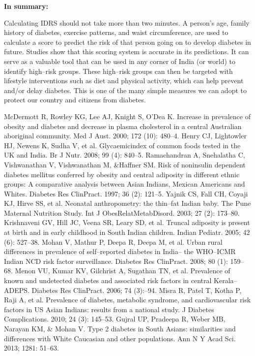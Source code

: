 \noindent\textbf{In summary:}

Calculating IDRS should not take more than two minutes. A person’s age, family history of diabetes, exercise patterns, and waist circumference, are used to calculate a score to predict the risk of that person going on to develop diabetes in future. Studies show that this scoring system is accurate in its predictions. It can serve as a valuable tool that can be used in any corner of India (or world) to identify high–risk groups. These high–risk groups can then be targeted with lifestyle interventions such as diet and physical activity, which can help prevent and/or delay diabetes. This is one of the many simple measures we can adopt to protect our country and citizens from diabetes.


\begin{thebibliography}{99}
 McDermott R, Rowley KG, Lee AJ, Knight S, O’Dea K. Increase in prevalence of obesity and diabetes and decrease in plasma chole\-sterol in a central Australian aboriginal community. Med J Aust. 2000; 172 (10): 480–4.
  Henry CJ, Lightowler HJ, Newens K, Sudha V, et al. Glycaemic\break index of common foods tested in the UK and India. Br J Nutr. 2008; 99 (4): 840–5.
  Ramachandran A, Snehalatha C, Vishwanathan V, Vishwanathan M, \&Haffner SM. Risk of noninsulin dependent diabetes mellitus conferred by obesity and central adiposity in different ethnic groups: A comparative analysis between Asian Indians, Mexican Americans and Whites. Diabetes Res ClinPract. 1997; 36 (2): 121–5.
  Yajnik CS, Fall CH, Coyaji KJ, Hirve SS, et al. Neonatal anthropo\-metry: the thin–fat Indian baby. The Pune Maternal Nutrition Study. Int J ObesRelatMetabDisord. 2003; 27 (2): 173–80.
  Krishnaveni GV, Hill JC, Veena SR, Leary SD, et al. Truncal adiposity is present at birth and in early childhood in South Indian children. Indian Pediatr. 2005; 42 (6): 527–38.
  Mohan V, Mathur P, Deepa R, Deepa M, et al. Urban rural differe\-nces in prevalence of self–reported diabetes in India– the WHO–ICMR Indian NCD risk factor surveillance. Diabetes Res ClinPract. 2008; 80 (1): 159–68.
  Menon VU, Kumar KV, Gilchrist A, Sugathan TN, et al. Prevalence of known and undetected diabetes and associated risk fa\-ctors in central Kerala–ADEPS. Diabetes Res ClinPract. 2006; 74 (3):–94.
  Misra R, Patel T, Kotha P, Raji A, et al. Prevalence of diabetes, metabolic syndrome, and cardiovascular risk factors in US Asian Indians: results from a national study. J Diabetes Complications. 2010; 24 (3): 145–53.
  Gujral UP, Pradeepa R, Weber MB, Narayan KM, \& Mohan V. Type 2 diabetes in South Asians: similarities and differences with White Caucasian and other populations. Ann N Y Acad Sci. 2013; 1281: 51–63.
 \end{thebibliography}


